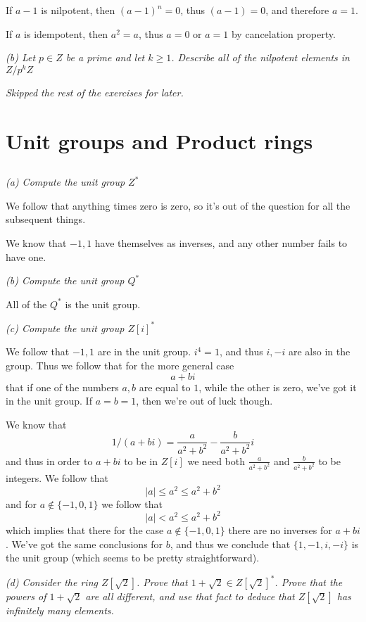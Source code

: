 \documentclass[11pt,oneside,titlepage]{book}
\newcommand{\set}[1]{\{ #1 \}}
\begin{document}
If $a - 1$ is nilpotent, then $(a - 1)^n = 0$, thus $(a - 1) = 0$, and
therefore $a = 1$.

If $a$ is idempotent, then $a^2 = a$, thus $a = 0$ or $a = 1$ by
cancelation property.

\textit{(b) Let $p \in Z$ be a prime and let $k \geq 1$. Describe all
of the nilpotent elements in $Z/p^kZ$}

\textit{Skipped the rest of the exercises for later.}

\section{Unit groups and Product rings}

\subsection{}

\textit{(a) Compute the unit group $Z^*$}

We follow that anything times zero is zero, so it's out of the
question for all the subsequent things.

We know that $-1, 1$ have themselves as inverses, and any other number
fails to have one.

\textit{(b) Compute the unit group $Q^*$}

All of the $Q^*$ is the unit group.

\textit{(c) Compute the unit group $Z[i]^*$}

We follow that $-1, 1$ are in the unit group. $i^4 = 1$, and thus $i,
-i$ are also in the group. Thus we follow that for the more general
case
$$a + bi$$
that if one of the numbers $a, b$ are equal to $1$, while the other is
zero, we've got it in the unit group. If $a = b = 1$, then we're out
of luck though.

We know that
$$1 / (a + bi) = \frac{a}{a^2 + b^2}  - \frac{b}{a^2 + b^2}i$$
and thus in order to $a + bi$ to be in $Z[i]$ we need both
$\frac{a}{a^2 + b^2}$ and $\frac{b}{a^2 + b^2}$ to be integers.  We
follow that
$$|a| \leq a^2 \leq a^2 + b^2$$
and for $a \notin \set{-1, 0, 1}$ we follow that
$$|a| < a^2 \leq a^2 + b^2$$
which implies that there for the case $a \notin \set{-1, 0, 1}$ there
are no inverses for $a + bi$. We've got the same conclusions for $b$,
and thus we conclude that $\set{1, -1, i, -i}$ is the unit group
(which seems to be pretty straightforward).

\textit{(d) Consider the ring $Z[\sqrt{2}]$. Prove that $1 + \sqrt{2}
\in Z[\sqrt{2}]^*$. Prove that the powers of $1 + \sqrt{2}$ are all
different, and use that fact to deduce that $Z[\sqrt{2}]$ has
infinitely many elements.}
\end{document}
